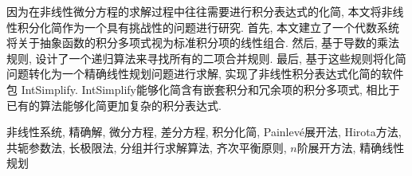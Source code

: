 因为在非线性微分方程的求解过程中往往需要进行积分表达式的化简, 本文将非线性积分化简作为一个具有挑战性的问题进行研究. 首先, 本文建立了一个代数系统将关于抽象函数的积分多项式视为标准积分项的线性组合. 然后, 基于导数的乘法规则, 设计了一个递归算法来寻找所有的二项合并规则. 最后, 基于这些规则将化简问题转化为一个精确线性规划问题进行求解, 实现了非线性积分表达式化简的软件包 IntSimplify.  IntSimplify能够化简含有嵌套积分和冗余项的积分多项式, 相比于已有的算法能够化简更加复杂的积分表达式. 


\bigskip

非线性系统, 精确解, 微分方程, 差分方程, 积分化简, Painlevé展开法, Hirota方法, 共轭参数法, 长极限法, 分组并行求解算法, 齐次平衡原则, $n$阶展开方法, 精确线性规划
